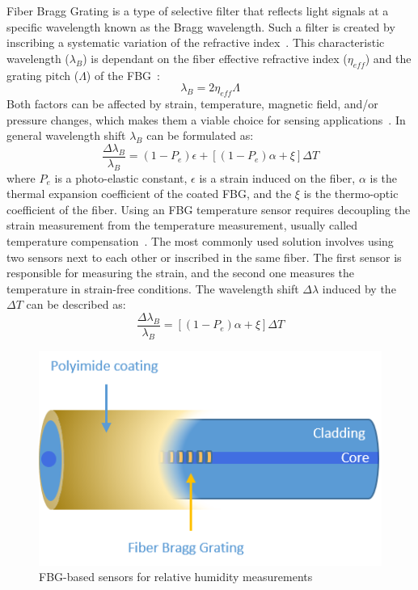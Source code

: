 Fiber Bragg Grating is a type of selective filter that reflects light signals at a specific wavelength known as the Bragg wavelength. Such a filter is created by inscribing a systematic variation of the refractive index~\cite{fbg_overview}. This characteristic wavelength ($\lambda_{B}$) is dependant on the fiber effective refractive index ($\eta_{eff}$) and the grating pitch ($\Lambda$) of the \gls{FBG}~\cite{Othonos2000FiberBG}:
\begin{equation}
    \lambda_{B} = 2 \eta_{eff} \Lambda
\end{equation}
Both factors can be affected by strain, temperature, magnetic field, and/or pressure changes, which makes them a viable choice for sensing applications~\cite{Yun-Jiang_Rao_1997}. In general wavelength shift $\lambda_{B}$ can be formulated as:
\begin{equation}
    \frac{\Delta\lambda_{B}}{\lambda_{B}}=(1-P_{e}) \epsilon + \left [(1-P_{e}) \alpha + \xi  \right ] \Delta T
\end{equation}
where $P_{e}$ is a photo-elastic constant, $\epsilon$ is a strain induced on the fiber, $\alpha$ is the thermal expansion coefficient of the coated \gls{FBG}, and the $\xi$ is the thermo-optic coefficient of the fiber. Using an \gls{FBG} temperature sensor requires decoupling the strain measurement from the temperature measurement, usually called temperature compensation~\cite{Yun-Jiang_Rao_1997}. The most commonly used solution involves using two sensors next to each other or inscribed in the same fiber. The first sensor is responsible for measuring the strain, and the second one measures the temperature in strain-free conditions. The wavelength shift $\Delta \lambda$ induced by the $\Delta T$ can be described as:
\begin{equation}
    \frac{\Delta\lambda_{B}}{\lambda_{B}}=\left [(1-P_{e}) \alpha + \xi  \right ] \Delta T
\end{equation}


\begin{figure}[!h]
\centering
\includegraphics[width=0.45\columnwidth]{Chapter5/images/Picture1.png}
\caption{FBG-based sensors for relative humidity measurements}
\label{fig:fbg_scheme}
\end{figure}


